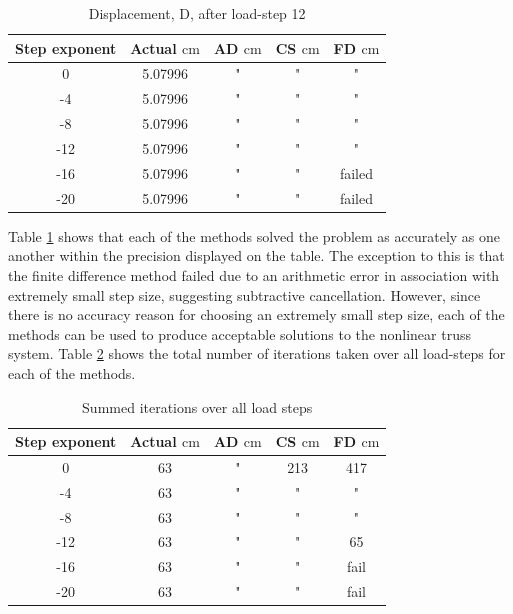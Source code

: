 \documentclass[preprint,12pt]{elsarticle}
\begin{document}
\begin{table}[!ht]    
  \centering
        \caption{Displacement, D, after load-step 12} \label{tab:Verification}   
        \begin{tabular}{c c c c c}
         \toprule
         Step exponent & Actual $\si{\centi\meter}$ & AD $\si{\centi\meter}$ & CS $\si{\centi\meter}$ & FD $\si{\centi\meter}$\\ 
        \midrule
        0 & 5.07996 & " & " & "\\
        -4 & 5.07996 & " & " & "\\
        -8 & 5.07996 & " & " & "\\
        -12 & 5.07996 & " & " & " \\
        -16 & 5.07996 & " & " & failed \\
        -20 & 5.07996 & " & " & failed \\
        \bottomrule
    \end{tabular}
\end{table}

Table \ref{tab:Verification} shows that each of the methods solved the problem
as accurately as one another within the precision displayed on the table. The
exception to this is that the finite difference method failed due to an
arithmetic error in association with extremely small step size, suggesting
subtractive cancellation. However, since there is no accuracy reason for
choosing an extremely small step size, each of the methods can be used to
produce acceptable solutions to the nonlinear truss system. Table
\ref{tab:ConvergenceStudy} shows the total number of iterations taken over all
load-steps for each of the methods. 

\begin{table}[!ht]    
  \centering
        \caption{Summed iterations over all load steps} \label{tab:ConvergenceStudy}   
        \begin{tabular}{c c c c c}
         \toprule
         Step exponent & Actual $\si{\centi\meter}$ & AD $\si{\centi\meter}$ & CS $\si{\centi\meter}$ & FD $\si{\centi\meter}$\\ 
        \midrule
        0 & 63 & " & 213 & 417\\
        -4 & 63 & " & " & "\\
        -8 & 63& " & " & "\\
        -12 &63& " & " &  65\\
        -16 &63& " & " & fail\\
        -20 &63& " & " & fail\\
        \bottomrule
    \end{tabular}
\end{table}
\end{document}
